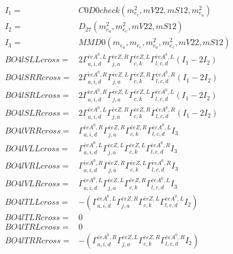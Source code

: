 \documentclass[A4,landscape]{article}
\begin{document}
\begin{align} 
I_1 = & C0D0check(m^2_{e_{{c}}}, mV22, mS12, m^2_{e_{{a}}}) \\ 
I_2 = & D_{27}(m^2_{e_{{a}}}, m^2_{e_{{c}}}, mV22, mS12) \\ 
I_3 = & MMD0(m_{e_{{a}}}, m_{e_{{c}}}, m^2_{e_{{a}}}, m^2_{e_{{c}}}, mV22, mS12) \\ 
  BO4lSLLcross= & 2  \Gamma^{\bar{e}e A^0 ,L}_{a, i, d} \Gamma^{\bar{e}e Z ,R}_{j, a} \Gamma^{\bar{e}e Z ,L}_{c, k} \Gamma^{\bar{e}e A^0 ,L}_{l, c, d} (I_1 - 2 I_2) \\ 
  BO4lSRRcross= & 2  \Gamma^{\bar{e}e A^0 ,R}_{a, i, d} \Gamma^{\bar{e}e Z ,L}_{j, a} \Gamma^{\bar{e}e Z ,R}_{c, k} \Gamma^{\bar{e}e A^0 ,R}_{l, c, d} (I_1 - 2 I_2) \\ 
  BO4lSRLcross= & 2  \Gamma^{\bar{e}e A^0 ,R}_{a, i, d} \Gamma^{\bar{e}e Z ,L}_{j, a} \Gamma^{\bar{e}e Z ,L}_{c, k} \Gamma^{\bar{e}e A^0 ,L}_{l, c, d} (I_1 - 2 I_2) \\ 
  BO4lSLRcross= & 2  \Gamma^{\bar{e}e A^0 ,L}_{a, i, d} \Gamma^{\bar{e}e Z ,R}_{j, a} \Gamma^{\bar{e}e Z ,R}_{c, k} \Gamma^{\bar{e}e A^0 ,R}_{l, c, d} (I_1 - 2 I_2) \\ 
  BO4lVRRcross= &  \Gamma^{\bar{e}e A^0 ,R}_{a, i, d} \Gamma^{\bar{e}e Z ,R}_{j, a} \Gamma^{\bar{e}e Z ,R}_{c, k} \Gamma^{\bar{e}e A^0 ,L}_{l, c, d} I_3 \\ 
  BO4lVLLcross= &  \Gamma^{\bar{e}e A^0 ,L}_{a, i, d} \Gamma^{\bar{e}e Z ,L}_{j, a} \Gamma^{\bar{e}e Z ,L}_{c, k} \Gamma^{\bar{e}e A^0 ,R}_{l, c, d} I_3 \\ 
  BO4lVRLcross= &  \Gamma^{\bar{e}e A^0 ,R}_{a, i, d} \Gamma^{\bar{e}e Z ,R}_{j, a} \Gamma^{\bar{e}e Z ,L}_{c, k} \Gamma^{\bar{e}e A^0 ,R}_{l, c, d} I_3 \\ 
  BO4lVLRcross= &  \Gamma^{\bar{e}e A^0 ,L}_{a, i, d} \Gamma^{\bar{e}e Z ,L}_{j, a} \Gamma^{\bar{e}e Z ,R}_{c, k} \Gamma^{\bar{e}e A^0 ,L}_{l, c, d} I_3 \\ 
  BO4lTLLcross= & -( \Gamma^{\bar{e}e A^0 ,L}_{a, i, d} \Gamma^{\bar{e}e Z ,R}_{j, a} \Gamma^{\bar{e}e Z ,L}_{c, k} \Gamma^{\bar{e}e A^0 ,L}_{l, c, d} I_2) \\ 
  BO4lTLRcross= & 0 \\ 
  BO4lTRLcross= & 0 \\ 
  BO4lTRRcross= & -( \Gamma^{\bar{e}e A^0 ,R}_{a, i, d} \Gamma^{\bar{e}e Z ,L}_{j, a} \Gamma^{\bar{e}e Z ,R}_{c, k} \Gamma^{\bar{e}e A^0 ,R}_{l, c, d} I_2) \\ 
\end{align} 
\end{document}
